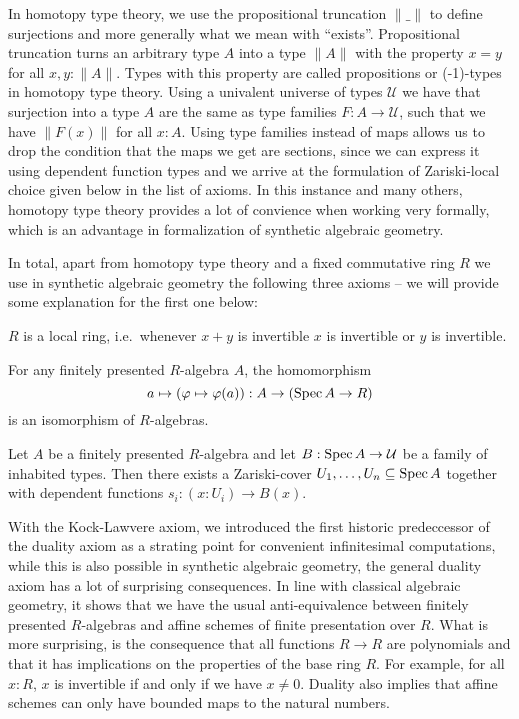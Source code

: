 In homotopy type theory, we use the propositional truncation $\|\_\|$ to define surjections and more generally what we mean with ``exists''.
Propositional truncation turns an arbitrary type $A$ into a type $\|A\|$ with the property $x=y$ for all $x,y:\|A\|$.
Types with this property are called propositions or (-1)-types in homotopy type theory.
Using a univalent universe of types $\mathcal U$ we have that surjection into a type $A$ are the same as type families $F:A\to \mathcal U$, such that we have $\|F(x)\|$ for all $x: A$.
Using type families instead of maps allows us to drop the condition that the maps we get are sections, since we can express it using dependent function types and we arrive at the formulation of Zariski-local choice given below in the list of axioms.
In this instance and many others, homotopy type theory provides a lot of convience when working very formally, which is an advantage in formalization of synthetic algebraic geometry.

In total, apart from homotopy type theory and a fixed commutative ring $R$ we use in synthetic algebraic geometry the following three axioms -- we will provide some explanation for the first one below:

\begin{center}
\begin{axiom}[Locality]%
  \label{loc}
  $R$ is a local ring, i.e.\ whenever $x+y$ is invertible $x$ is invertible or $y$ is invertible.
\end{axiom}

\begin{axiom}[Duality]%
  \label{sqc}
  For any finitely presented $R$-algebra $A$, the homomorphism
  \[ a \mapsto (\varphi\mapsto \varphi(a)) : A \to (\operatorname{Spec} A \to R)\]
  is an isomorphism of $R$-algebras.
\end{axiom}

\begin{axiom}%
  \label{Z-choice}
  Let $A$ be a finitely presented $R$-algebra
  and let $B : \operatorname{Spec} A \to \mathcal{U}$ be a family of inhabited types.
  Then there exists a Zariski-cover $U_1,\dots,U_n\subseteq \operatorname{Spec} A$
  together with dependent functions $s_i : (x : U_i)\to B(x)$.
\end{axiom}
\end{center}

With the Kock-Lawvere axiom, we introduced the first historic predeccessor of the duality axiom as a strating point for convenient infinitesimal computations,
while this is also possible in synthetic algebraic geometry, the general duality axiom has a lot of surprising consequences.
In line with classical algebraic geometry, it shows that we have the usual anti-equivalence between finitely presented $R$-algebras and affine schemes of finite presentation over $R$.
What is more surprising, is the consequence that all functions $R\to R$ are polynomials and that it has implications on the properties of the base ring $R$.
For example, for all $x:R$, $x$ is invertible if and only if we have $x\neq 0$.
Duality also implies that affine schemes can only have bounded maps to the natural numbers.

